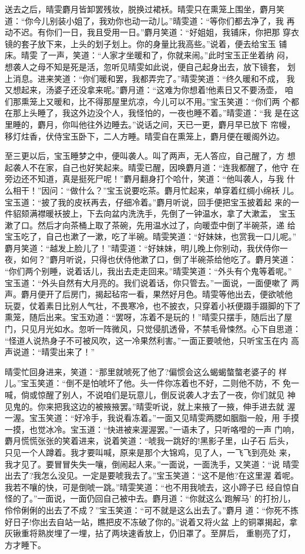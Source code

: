 送去之后，晴雯麝月皆卸罢残妆，脱换过裙袄。晴雯只在熏笼上围坐，麝月笑
道：“你今儿别装小姐了，我劝你也动一动儿。”晴雯道：“等你们都去净了，我
再动不迟。有你们一日，我且受用一日。”麝月笑道：“好姐姐，我铺床，你把那
穿衣镜的套子放下来，上头的划子划上。你的身量比我高些。”说着，便去给宝玉
铺床。晴雯了一声，笑道：“人家才坐暖和了，你就来闹。”此时宝玉正坐着纳
闷，想袭人之母不知是死是活，忽听见晴雯如此说，便自己起身出去，放下镜套，
划上消息。进来笑道：“你们暖和罢，我都弄完了。”晴雯笑道：“终久暖和不成，
我又想起来，汤婆子还没拿来呢。”麝月道：“这难为你想着!他素日又不要汤壶，
咱们那熏笼上又暖和，比不得那屋里炕凉，今儿可以不用。”宝玉笑道：“你们两
个都在那上头睡了，我这外边没个人，我怪怕的，一夜也睡不着。”晴雯道：“我
是在这里睡的，麝月，你叫他往外边睡去。”说话之间，天已一更，麝月早已放下
帘幔，移灯炷香，伏侍宝玉卧下，二人方睡。晴雯自在熏笼上，麝月便在暖阁外边。

至三更以后，宝玉睡梦之中，便叫袭人。叫了两声，无人答应，自己醒了，方
想起袭人不在家，自己也好笑起来。晴雯已醒，因唤麝月道：“连我都醒了，他守
在旁边还不知道，真是挺死尸呢！”麝月翻身打个哈什，笑道：“他叫袭人，与我
什么相干！”因问：“做什么？”宝玉说要吃茶。麝月忙起来，单穿着红绸小绵袄
儿。宝玉道：“披了我的皮袄再去，仔细冷着。”麝月听说，回手便把宝玉披着起
来的一件貂颏满襟暖袄披上，下去向盆内洗洗手，先倒了一钟温水，拿了大漱盂，
宝玉漱了口。然后才向茶桶上取了茶碗，先用温水过了，向暖壶中倒了半碗茶，递
给宝玉吃了，自己也漱了一漱，吃了半碗。晴雯笑道：“好妹妹，也赏我一口儿呢。”
麝月笑道：“越发上脸儿了！”晴雯道：“好妹妹，明儿晚上你别动，我伏侍你一
夜，如何？”麝月听说，只得也伏侍他漱了口，倒了半碗茶给他吃了。麝月笑道：
“你们两个别睡，说着话儿，我出去走走回来。”晴雯笑道：“外头有个鬼等着呢。”
宝玉道：“外头自然有大月亮的。我们说着话，你只管去。”一面说，一面便嗽了
两声。麝月便开了后房门，揭起毡帘一看，果然好月色。晴雯等他出去，便欲唬他
玩耍，仗着素日比别人气壮，不畏寒冷，也不披衣，只穿着小袄便蹑手蹑脚的下了
熏笼，随后出来。宝玉劝道：“罢呀，冻着不是玩的！”晴雯只摆手，随后出了屋
门，只见月光如水。忽听一阵微风，只觉侵肌透骨，不禁毛骨悚然。心下自思道：
“怪道人说热身子不可被风吹，这一冷果然利害。”一面正要唬他，只听宝玉在内
高声说道：“晴雯出来了！”

晴雯忙回身进来，笑道：“那里就唬死了他了?偏惯会这么蝎蝎螫螫老婆子的
样儿。”宝玉笑道：“倒不是怕唬坏了他。头一件你冻着也不好，二则他不防，不
免一喊，倘或惊醒了别人，不说咱们是玩意儿，倒反说袭人才去了一夜，你们就见
神见鬼的。你来把我这边的被掖掖罢。”晴雯听说，就上来掖了一掖，伸手进去就
渥一渥。宝玉笑道：“好冷手，我说看冻着。”一面又见晴雯两腮如胭脂一般，用
手摸一摸，也觉冰冷。宝玉道：“快进被来渥渥罢。”一语未了，只听咯噔的一声
门响，麝月慌慌张张的笑着进来，说着笑道：“唬我一跳好的!黑影子里，山子石
后头，只见一个人蹲着。我才要叫喊，原来是那个大锦鸡，见了人，一飞飞到亮处
来，我才见了。要冒冒失失一嚷，倒闹起人来。”一面说，一面洗手，又笑道：“说
晴雯出去了?我怎么没见。一定是要唬我去了。”宝玉笑道：“这不是他?在这里渥
着呢。我若不嚷的快，可是倒唬一跳。”晴雯笑道：“也不用我唬去，这小蹄子已
经自惊自怪的了。”一面说，一面仍回自己被中去。麝月道：“你就这么‘跑解马’
的打扮儿，伶伶俐俐的出去了不成？”宝玉笑道：“可不就是这么出去了。”麝月
道：“你死不拣好日子!你出去自站一站，瞧把皮不冻破了你的。”说着又将火盆
上的铜罩揭起，拿灰锹重将熟炭埋了一埋，拈了两块速香放上，仍旧罩了。至屏后，
重剔亮了灯，方才睡下。

